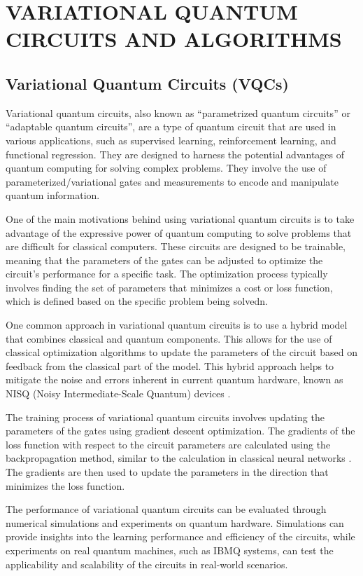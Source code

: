\documentclass[inscr,ack,preface]{diphdthesis}
\begin{document}
\chapter{VARIATIONAL QUANTUM CIRCUITS AND ALGORITHMS \label{VQA}}

\section{Variational Quantum Circuits (VQCs)}

Variational quantum circuits, also known as ``parametrized quantum circuits'' or ``adaptable quantum circuits'', are a type of quantum circuit that are used in various applications, such as supervised learning, reinforcement learning, and functional regression. They are designed to harness the potential advantages of quantum computing for solving complex problems. They involve the use of parameterized/variational gates and measurements to encode and manipulate quantum information.

One of the main motivations behind using variational quantum circuits is to take advantage of the expressive power of quantum computing to solve problems that are difficult for classical computers. These circuits are designed to be trainable, meaning that the parameters of the gates can be adjusted to optimize the circuit's performance for a specific task. The optimization process typically involves finding the set of parameters that minimizes a cost or loss function, which is defined based on the specific problem being solvedn\cite{vqc}.

One common approach in variational quantum circuits is to use a hybrid model that combines classical and quantum components. This allows for the use of classical optimization algorithms to update the parameters of the circuit based on feedback from the classical part of the model. This hybrid approach helps to mitigate the noise and errors inherent in current quantum hardware, known as NISQ (Noisy Intermediate-Scale Quantum) devices \cite{vqc2}.

The training process of variational quantum circuits involves updating the parameters of the gates using gradient descent optimization. The gradients of the loss function with respect to the circuit parameters are calculated using the backpropagation method, similar to the calculation in classical neural networks \cite{vqc_arch}. The gradients are then used to update the parameters in the direction that minimizes the loss function.

The performance of variational quantum circuits can be evaluated through numerical simulations and experiments on quantum hardware. Simulations can provide insights into the learning performance and efficiency of the circuits, while experiments on real quantum machines, such as IBMQ systems, can test the applicability and scalability of the circuits in real-world scenarios.
\end{document}
